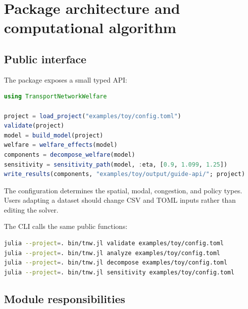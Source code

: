 \chapter{Package architecture and computational algorithm}
\label{ch:code}

\section{Public interface}

The package exposes a small typed API:
\begin{lstlisting}[language=Julia]
using TransportNetworkWelfare

project = load_project("examples/toy/config.toml")
validate(project)
model = build_model(project)
welfare = welfare_effects(model)
components = decompose_welfare(model)
sensitivity = sensitivity_path(model, :eta, [0.9, 1.099, 1.25])
write_results(components, "examples/toy/output/guide-api/"; project)
\end{lstlisting}

The configuration determines the spatial, modal, congestion, and policy
types. Users adapting a dataset should change CSV and TOML inputs rather than
editing the solver.

The CLI calls the same public functions:
\begin{lstlisting}[language=bash]
julia --project=. bin/tnw.jl validate examples/toy/config.toml
julia --project=. bin/tnw.jl analyze examples/toy/config.toml
julia --project=. bin/tnw.jl decompose examples/toy/config.toml
julia --project=. bin/tnw.jl sensitivity examples/toy/config.toml
\end{lstlisting}

\section{Module responsibilities}

